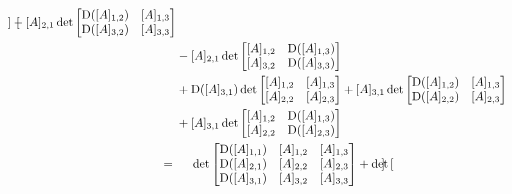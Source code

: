 \documentclass[../libro.tex]{subfiles}
\begin{document}
\begin{example}
\begin{align*}
{\begin{bmatrix}
        \end{bmatrix}}
        - [A]_{2,1}
        \det {
            \begin{bmatrix}
                \mathrm{D} ([A]_{1,2}) & [A]_{1,3} \\
                \mathrm{D} ([A]_{3,2}) & [A]_{3,3} \\
        \end{bmatrix}}
        \\
        &
        - [A]_{2,1}
        \det {
            \begin{bmatrix}
                [A]_{1,2} & \mathrm{D} ([A]_{1,3}) \\
                [A]_{3,2} & \mathrm{D} ([A]_{3,3}) \\
        \end{bmatrix}}
        \\
        &
        + \mathrm{D} ([A]_{3,1})
        \det {
            \begin{bmatrix}
                [A]_{1,2} & [A]_{1,3} \\
                [A]_{2,2} & [A]_{2,3} \\
        \end{bmatrix}}
        + [A]_{3,1}
        \det {
            \begin{bmatrix}
                \mathrm{D} ([A]_{1,2}) & [A]_{1,3} \\
                \mathrm{D} ([A]_{2,2}) & [A]_{2,3} \\
        \end{bmatrix}}
        \\
        &
        + [A]_{3,1}
        \det {
            \begin{bmatrix}
                [A]_{1,2} & \mathrm{D} ([A]_{1,3}) \\
                [A]_{2,2} & \mathrm{D} ([A]_{2,3}) \\
        \end{bmatrix}}
        \\
        = {} &
        \hphantom{{} + {}}
        \det {
            \begin{bmatrix}
                \mathrm{D} ([A]_{1,1}) & [A]_{1,2} & [A]_{1,3} \\
                \mathrm{D} ([A]_{2,1}) & [A]_{2,2} & [A]_{2,3} \\
                \mathrm{D} ([A]_{3,1}) & [A]_{3,2} & [A]_{3,3} \\
        \end{bmatrix}}
        + \det {
            \begin{bmatrix}

\end{bmatrix}}
\end{align*}
\end{example}
\end{document}

